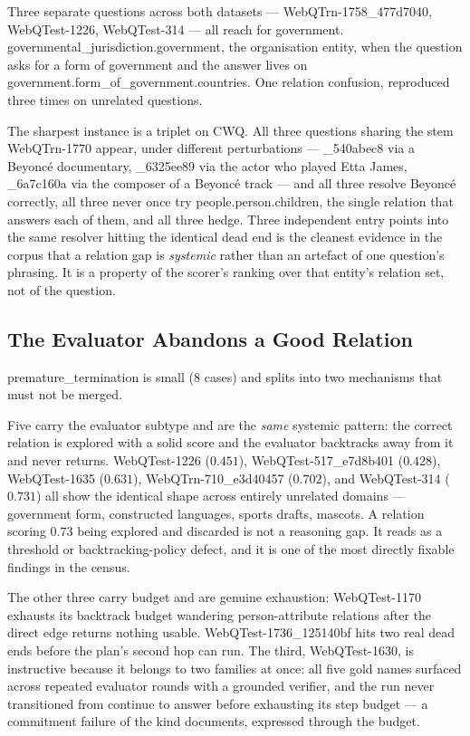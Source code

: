 Three separate questions across both datasets ---
\textsf{WebQTrn-1758\_477d7040}, \textsf{WebQTest-1226}, \textsf{WebQTest-314}
--- all reach for \textsf{government.\allowbreak
governmental\_jurisdiction.\allowbreak government}, the organisation entity,
when the question asks for a form of government and the answer lives on
\textsf{government.\allowbreak form\_of\_government.\allowbreak countries}. One
relation confusion, reproduced three times on unrelated questions.

The sharpest instance is a triplet on CWQ. All three questions sharing the stem
\textsf{WebQTrn-1770} appear, under different perturbations ---
\textsf{\_540abec8} via a Beyoncé documentary, \textsf{\_6325ee89} via the actor
who played Etta James, \textsf{\_6a7c160a} via the composer of a Beyoncé track
--- and all three resolve Beyoncé correctly, all three never once try
\textsf{people.person.children}, the single relation that answers each of them,
and all three hedge. Three independent entry points into the same resolver
hitting the identical dead end is the cleanest evidence in the corpus that a
relation gap is \emph{systemic} rather than an artefact of one question's
phrasing. It is a property of the scorer's ranking over that entity's relation
set, not of the question.

\subsection{The Evaluator Abandons a Good Relation}

\textsf{premature\_termination} is small ($8$ cases) and splits into two
mechanisms that must not be merged.

Five carry the \textsf{evaluator} subtype and are the \emph{same} systemic
pattern: the correct relation is explored with a solid score and the evaluator
backtracks away from it and never returns. \textsf{WebQTest-1226} ($0.451$),
\textsf{WebQTest-517\_e7d8b401} ($0.428$), \textsf{WebQTest-1635} ($0.631$),
\textsf{WebQTrn-710\_e3d40457} ($0.702$), and \textsf{WebQTest-314} ($0.731$)
all show the identical shape across entirely unrelated domains --- government
form, constructed languages, sports drafts, mascots. A relation scoring $0.73$
being explored and discarded is not a reasoning gap. It reads as a threshold or
backtracking-policy defect, and it is one of the most directly fixable findings
in the census.

The other three carry \textsf{budget} and are genuine exhaustion:
\textsf{WebQTest-1170} exhausts its backtrack budget wandering person-attribute
relations after the direct edge returns nothing usable.
\textsf{WebQTest-1736\_125140bf} hits two real dead ends before the plan's
second hop can run. The third, \textsf{WebQTest-1630}, is instructive because it
belongs to two families at once: all five gold names surfaced across repeated
evaluator rounds with a grounded verifier, and the run never transitioned from
\textsf{continue} to \textsf{answer} before exhausting its step budget --- a
commitment failure of the kind  documents,
expressed through the budget.

